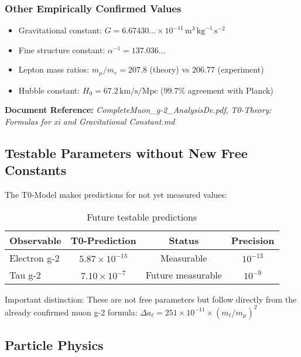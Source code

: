 \documentclass[12pt,a4paper]{article}
\newcommand{\alphapar}{\alpha}
\begin{document}
	\subsubsection{Other Empirically Confirmed Values}
	
	\begin{itemize}
		\item Gravitational constant: $G = 6.67430\ldots \times 10^{-11} \, \text{m}^3 \, \text{kg}^{-1} \, \text{s}^{-2}$ \checkmark
		\item Fine structure constant: $\alphapar^{-1} = 137.036\ldots$ \checkmark
		\item Lepton mass ratios: $m_\mu/m_e = 207.8$ (theory) vs $206.77$ (experiment) \checkmark
		\item Hubble constant: $H_0 = 67.2 \, \text{km/s/Mpc}$ (99.7\% agreement with Planck) \checkmark
	\end{itemize}
	
	\textbf{Document Reference:} \textit{CompleteMuon\_g-2\_AnalysisDe.pdf}, \textit{T0-Theory: Formulas for xi and Gravitational Constant.md}
	
	\subsection{Testable Parameters without New Free Constants}
	
	The T0-Model makes predictions for not yet measured values:
	
	\begin{table}[h]
		\centering
		\begin{tabular}{lccc}
			\toprule
			\textbf{Observable} & \textbf{T0-Prediction} & \textbf{Status} & \textbf{Precision} \\
			\midrule
			Electron g-2 & $5.87 \times 10^{-15}$ & Measurable & $10^{-13}$ \\
			Tau g-2 & $7.10 \times 10^{-7}$ & Future measurable & $10^{-9}$ \\
			\bottomrule
		\end{tabular}
		\caption{Future testable predictions}
	\end{table}
	
	Important distinction: These are not free parameters but follow directly from the already confirmed muon g-2 formula: $\Delta a_\ell = 251 \times 10^{-11} \times (m_\ell/m_\mu)^2$
	
	\subsection{Particle Physics}
	
\end{document}
